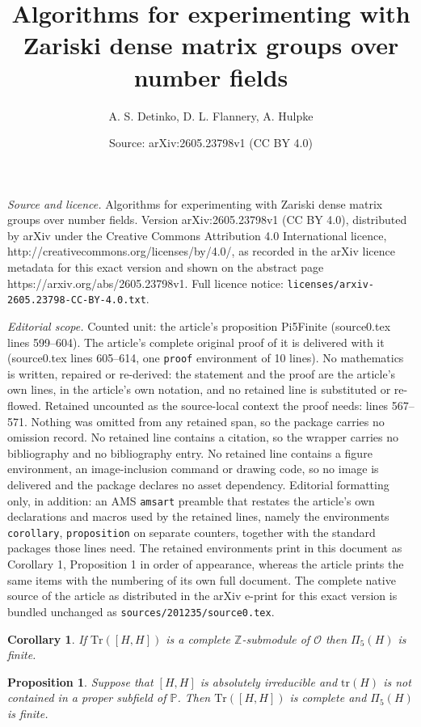 \documentclass[10pt,a4paper]{amsart}
\title{Algorithms for experimenting with Zariski dense matrix groups over number fields}
\author{A. S. Detinko, D. L. Flannery, A. Hulpke}
\date{Source: arXiv:2605.23798v1 (CC BY 4.0)}
\newtheorem{corollary}{Corollary}
\newtheorem{proposition}{Proposition}
\renewcommand{\P}{\mathbb{P}}
\newcommand{\Z}{\mathbb{Z}}
\newcommand{\tr}{\mathrm{tr}}
\begin{document}
\maketitle

\noindent\emph{Source and licence.} Algorithms for experimenting with Zariski dense matrix groups over number fields. Version arXiv:2605.23798v1 (CC BY 4.0), distributed by arXiv under the Creative Commons Attribution 4.0 International licence, http://creativecommons.org/licenses/by/4.0/, as recorded in the arXiv licence metadata for this exact version and shown on the abstract page https://arxiv.org/abs/2605.23798v1. Full licence notice: \texttt{licenses/arxiv-2605.23798-CC-BY-4.0.txt}.\par\smallskip

\noindent\textit{Editorial scope.} Counted unit: the article's proposition Pi5Finite (source0.tex lines 599--604). The article's complete original proof of it is delivered with it (source0.tex lines 605--614, one \texttt{proof} environment of 10 lines). No mathematics is written, repaired or re-derived: the statement and the proof are the article's own lines, in the article's own notation, and no retained line is substituted or re-flowed.  Retained uncounted as the source-local context the proof needs: lines 567--571.  Nothing was omitted from any retained span, so the package carries no omission record.  No retained line contains a citation, so the wrapper carries no bibliography and no bibliography entry.  No retained line contains a figure environment, an image-inclusion command or drawing code, so no image is delivered and the package declares no asset dependency.  Editorial formatting only, in addition: an AMS \texttt{amsart} preamble that restates the article's own declarations and macros used by the retained lines, namely the environments \texttt{corollary}, \texttt{proposition} on separate counters, together with the standard packages those lines need.  The retained environments print in this document as Corollary 1, Proposition 1 in order of appearance, whereas the article prints the same items with the numbering of its own full document.  The complete native source of the article as distributed in the arXiv e-print for this exact version is bundled unchanged as \texttt{sources/201235/source0.tex}.
\begin{corollary} 
\label{Pi5}
If $\mathrm{Tr}([H,H])$ is a complete $\Z$-submodule of 
$\mathcal{O}$ then $\Pi_5(H)$ is finite.
\end{corollary}

\begin{proposition}
\label{Pi5Finite}
Suppose that $[H,H]$ is absolutely irreducible and $\tr(H)$ is 
not contained in a proper subfield of $\P$. Then 
$\mathrm{Tr}([H,H])$ is complete and $\Pi_5(H)$ is finite.
\end{proposition}
\end{document}
